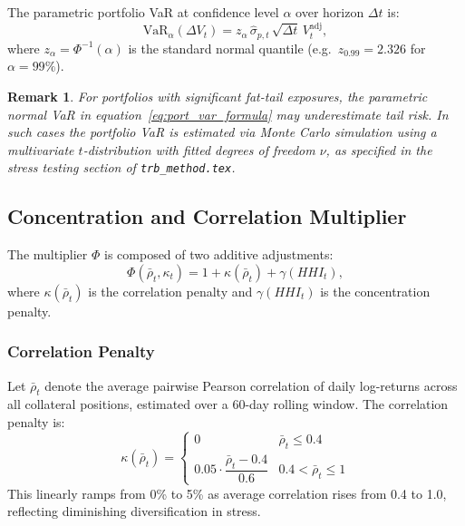 \documentclass[12pt, a4paper]{article}
\newtheorem{remark}{Remark}[section]
\newcommand{\VaR}{\mathrm{VaR}}
\begin{document}
\noindent The parametric portfolio VaR at confidence level $\alpha$
over horizon $\Delta t$ is:
\begin{equation}
    \VaR_\alpha\!\left(\Delta V_t\right)
    = z_\alpha\,\hat{\sigma}_{p,t}\,\sqrt{\Delta t}\,V_t^{\mathrm{adj}},
    \label{eq:port_var_formula}
\end{equation}
where $z_\alpha = \Phi^{-1}(\alpha)$ is the standard normal quantile
(e.g.\ $z_{0.99} = 2.326$ for $\alpha = 99\%$).

\begin{remark}
    For portfolios with significant fat-tail exposures, the parametric
    normal VaR in equation~\eqref{eq:port_var_formula} may underestimate
    tail risk. In such cases the portfolio VaR is estimated via Monte Carlo
    simulation using a multivariate $t$-distribution with fitted degrees of
    freedom $\nu$, as specified in the stress testing section of
    \texttt{trb\_method.tex}.
\end{remark}

\subsection{Concentration and Correlation Multiplier}
\label{subsec:concentration_multiplier}

The multiplier $\Phi$ is composed of two additive adjustments:
\begin{equation}
    \Phi(\bar{\rho}_t, \kappa_t) = 1 + \kappa(\bar{\rho}_t) + \gamma(HHI_t),
    \label{eq:phi}
\end{equation}
where $\kappa(\bar{\rho}_t)$ is the correlation penalty and $\gamma(HHI_t)$
is the concentration penalty.

\subsubsection*{Correlation Penalty}

Let $\bar{\rho}_t$ denote the average pairwise Pearson correlation of daily
log-returns across all collateral positions, estimated over a 60-day rolling
window. The correlation penalty is:
\begin{equation}
    \kappa(\bar{\rho}_t) =
    \begin{cases}
        0 & \bar{\rho}_t \leq 0.4 \\[4pt]
        0.05 \cdot \dfrac{\bar{\rho}_t - 0.4}{0.6} & 0.4 < \bar{\rho}_t \leq 1
    \end{cases}
    \label{eq:kappa_layer2}
\end{equation}
This linearly ramps from 0\% to 5\% as average correlation rises from 0.4
to 1.0, reflecting diminishing diversification in stress.
\end{document}
